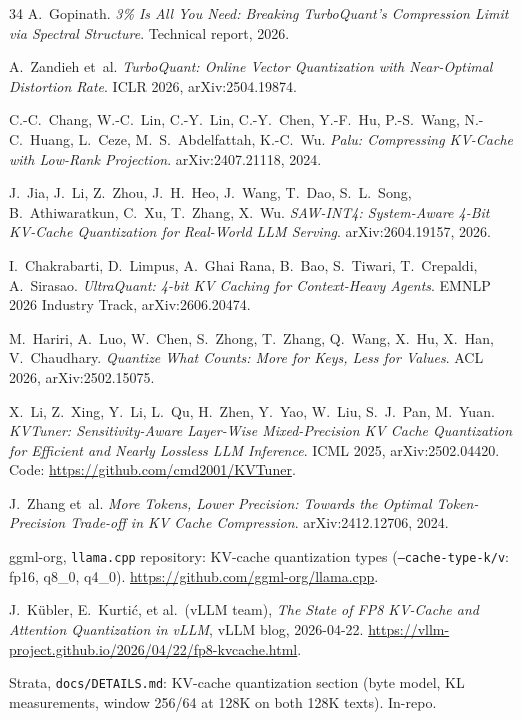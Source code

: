 \documentclass[10pt,twocolumn]{article}
\begin{document}
\begin{thebibliography}{34}
A.~Gopinath.
\emph{3\% Is All You Need: Breaking TurboQuant's Compression Limit via Spectral Structure}.
Technical report, 2026.

A.~Zandieh et~al.
\emph{TurboQuant: Online Vector Quantization with Near-Optimal Distortion Rate}.
ICLR 2026, arXiv:2504.19874.

C.-C.~Chang, W.-C.~Lin, C.-Y.~Lin, C.-Y.~Chen, Y.-F.~Hu, P.-S.~Wang, N.-C.~Huang, L.~Ceze, M.~S.~Abdelfattah, K.-C.~Wu.
\emph{Palu: Compressing KV-Cache with Low-Rank Projection}.
arXiv:2407.21118, 2024.

J.~Jia, J.~Li, Z.~Zhou, J.~H.~Heo, J.~Wang, T.~Dao, S.~L.~Song, B.~Athiwaratkun, C.~Xu, T.~Zhang, X.~Wu.
\emph{SAW-INT4: System-Aware 4-Bit KV-Cache Quantization for Real-World LLM Serving}.
arXiv:2604.19157, 2026.

I.~Chakrabarti, D.~Limpus, A.~Ghai Rana, B.~Bao, S.~Tiwari, T.~Crepaldi, A.~Sirasao.
\emph{UltraQuant: 4-bit KV Caching for Context-Heavy Agents}.
EMNLP 2026 Industry Track, arXiv:2606.20474.

M.~Hariri, A.~Luo, W.~Chen, S.~Zhong, T.~Zhang, Q.~Wang, X.~Hu, X.~Han, V.~Chaudhary.
\emph{Quantize What Counts: More for Keys, Less for Values}.
ACL 2026, arXiv:2502.15075.

X.~Li, Z.~Xing, Y.~Li, L.~Qu, H.~Zhen, Y.~Yao, W.~Liu, S.~J.~Pan, M.~Yuan.
\emph{KVTuner: Sensitivity-Aware Layer-Wise Mixed-Precision KV Cache Quantization for Efficient and Nearly Lossless LLM Inference}.
ICML 2025, arXiv:2502.04420. Code: \url{https://github.com/cmd2001/KVTuner}.

J.~Zhang et~al.
\emph{More Tokens, Lower Precision: Towards the Optimal Token-Precision Trade-off in KV Cache Compression}.
arXiv:2412.12706, 2024.

ggml-org, \texttt{llama.cpp} repository:
KV-cache quantization types (\texttt{--cache-type-k/v}: fp16, q8\_0, q4\_0).
\url{https://github.com/ggml-org/llama.cpp}.

J.~K{\"u}bler, E.~Kurti{\'c}, et al.\ (vLLM team), \emph{The State of FP8 KV-Cache and Attention Quantization in vLLM}, vLLM blog, 2026-04-22.
\url{https://vllm-project.github.io/2026/04/22/fp8-kvcache.html}.

Strata, \texttt{docs/DETAILS.md}: KV-cache quantization section (byte model, KL measurements, window 256/64 at 128K on both 128K texts). In-repo.


\end{thebibliography}
\end{document}
